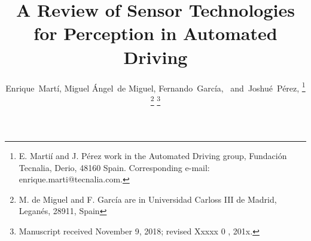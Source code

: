 \documentclass[journal]{IEEEtran}
\begin{document}
%
\title{A Review of Sensor Technologies for Perception in Automated Driving}
%
%
%

\author{Enrique~Mart\'i, %
        Miguel \'Angel~de Miguel, %
		Fernando~Garc\'ia,~
        and~Joshu\'e~P\'erez,%
\thanks{E. Marti\'i and J. P\'erez work in the Automated Driving group,
 Fundaci\'on Tecnalia, Derio, 48160 Spain. Corresponding e-mail: 
 enrique.marti@tecnalia.com.}%
\thanks{M. de Miguel and F. Garc\'ia are in Universidad Carloss III de Madrid, 
Legan\'es, 28911, Spain}%
\thanks{Manuscript received November 9, 2018; revised Xxxxx 0 , 201x.}}

% 
%
\end{document}
